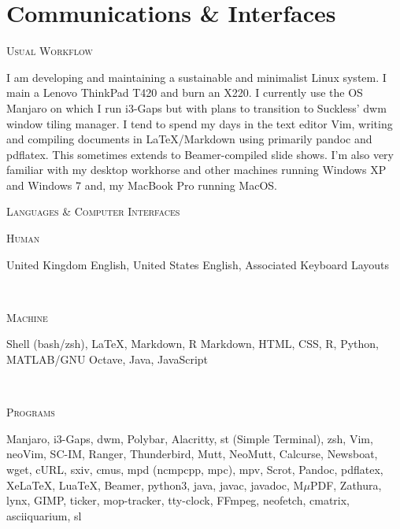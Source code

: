 \documentclass[11pt, english]{article}
\begin{document}
{\section{Communications \& Interfaces}

\begin{center}
	\textsc{Usual Workflow}
\end{center}

I am developing and maintaining a sustainable and minimalist Linux system. I main a Lenovo ThinkPad T420 and burn an X220. I currently use the OS Manjaro on which I run i3-Gaps but with plans to transition to Suckless' dwm window tiling manager. I tend to spend my days in the text editor Vim, writing and compiling documents in {\LaTeX}/Markdown using primarily pandoc and pdflatex. This sometimes extends to Beamer-compiled slide shows. I'm also very familiar with my desktop workhorse and other machines running Windows XP and Windows 7 and, my MacBook Pro running MacOS.

\begin{center}
	\textsc{Languages \& Computer Interfaces}
\end{center}

\begin{minipage}[t]{.15\linewidth}
        \hfill                  
        \textsc{Human}
\end{minipage}
\hfill\vline\hfill
\begin{minipage}[t]{.80\linewidth}
	United Kingdom English, United States English, Associated Keyboard Layouts
\end{minipage}\\

\begin{minipage}[t]{.15\linewidth}
        \hfill                  
        \textsc{Machine}
\end{minipage}
\hfill\vline\hfill
\begin{minipage}[t]{.80\linewidth}
	Shell (bash/zsh), {\LaTeX}, Markdown, R Markdown, HTML, CSS, R, Python, MATLAB/GNU Octave, Java, JavaScript
\end{minipage}\\

\begin{minipage}[t]{.15\linewidth}
        \hfill                  
        \textsc{Programs}    
\end{minipage}
\hfill\vline\hfill
\begin{minipage}[t]{.80\linewidth}
	Manjaro, i3-Gaps, dwm, Polybar, Alacritty, st (Simple Terminal), zsh, Vim, neoVim, SC-IM, Ranger, Thunderbird, Mutt, NeoMutt, Calcurse, Newsboat, wget, cURL, sxiv, cmus, mpd (ncmpcpp, mpc), mpv, Scrot, Pandoc, pdflatex, XeLaTeX, LuaTeX, Beamer, python3, java, javac, javadoc, M$\mu$PDF, Zathura, lynx, GIMP, ticker, mop-tracker, tty-clock, FFmpeg, neofetch, cmatrix, asciiquarium, sl
\end{minipage}\\

}
\end{document}
